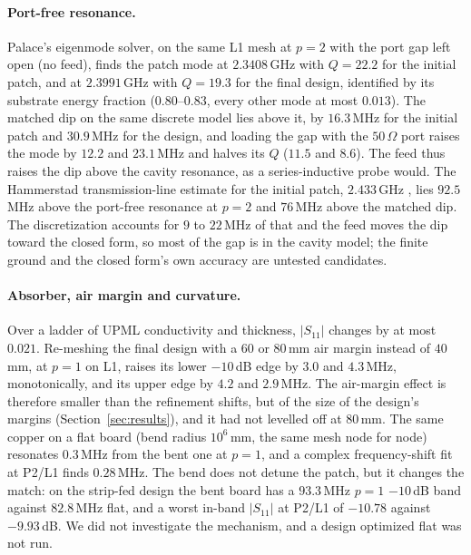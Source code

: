 \documentclass{anvil-paper}
\newcommand{\PL}{P2/L1}
\begin{document}
\paragraph{Port-free resonance.}
Palace's eigenmode solver, on the same L1 mesh at $p = 2$ with the port gap
left open (no feed), finds the patch mode at $2.3408$\,GHz with $Q = 22.2$
for the initial patch, and at $2.3991$\,GHz with $Q = 19.3$ for the final
design, identified by its substrate energy fraction ($0.80$--$0.83$, every
other mode at most $0.013$). The matched dip
on the same discrete model lies above it, by $16.3$\,MHz for the initial
patch and $30.9$\,MHz for the design, and loading the gap with the $50\,\Omega$ port raises the mode by $12.2$ and
$23.1$\,MHz and halves its $Q$ ($11.5$ and $8.6$). The feed thus raises the
dip above the cavity resonance, as a series-inductive probe would.
The Hammerstad transmission-line estimate for the initial patch,
$2.433$\,GHz \citep{hammerstad1975equations}, lies $92.5$\,MHz above the
port-free resonance at $p = 2$ and $76$\,MHz above the matched dip. The
discretization accounts for $9$ to $22$\,MHz of that and the feed moves the
dip toward the closed form, so most of the gap is in the cavity model; the
finite ground and the closed form's own accuracy are untested candidates.

\paragraph{Absorber, air margin and curvature.}
Over a ladder of UPML conductivity and thickness, $|S_{11}|$ changes by at
most $0.021$. Re-meshing the final design with a $60$ or $80$\,mm air margin
instead of $40$\,mm, at $p = 1$ on L1, raises its lower $-10$\,dB edge by
$3.0$ and $4.3$\,MHz, monotonically, and its upper edge by $4.2$ and
$2.9$\,MHz. The air-margin effect is therefore smaller than the refinement shifts,
but of the size of the design's margins (Section~\ref{sec:results}), and it
had not levelled off at $80$\,mm.
The same copper on a flat board (bend radius $10^6$\,mm, the same mesh node
for node) resonates $0.3$\,MHz from the bent one at $p = 1$, and a complex
frequency-shift fit at \PL{} finds $0.28$\,MHz. The bend does not detune the
patch, but it changes the match: on the strip-fed design the bent board has
a $93.3$\,MHz $p = 1$ $-10$\,dB band against $82.8$\,MHz flat, and a worst
in-band $|S_{11}|$ at \PL{} of $-10.78$ against $-9.93$\,dB. We did not
investigate the mechanism, and a design optimized flat was not run.
\end{document}
